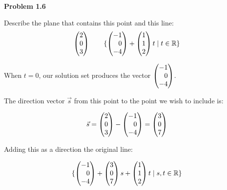 \documentclass[12pt]{article}
\newenvironment{problem}[1][default]{
  \begin{framed}\begin{minipage}{0.97\textwidth}
  \setlength{\parskip}{4mm}
  {\bf Problem #1}
}{\end{minipage}\end{framed}}
\newcommand\m[2][]{
	\ifthenelse{\equal {#1} {}}
		{\begin{pmatrix*}[r]#2\end{pmatrix*}}
		{\left(\begin{array}{#1}#2\end{array}\right)}
}
\begin{document}
\begin{problem}[1.6]
	Describe the plane that contains this point and this line:
	\begin{equation*}
		\m{2 \\ 0 \\ 3} \qquad \{ \m{-1 \\ 0 \\ -4} + \m{1 \\ 1 \\ 2}t \mid t \in \mathbb{R} \}
	\end{equation*}
\end{problem}

When $t = 0$, our solution set produces the vector $\m{-1 \\ 0 \\ -4}$.

The direction vector $\vec{s}$ from this point to the point we wish to include is:

\begin{equation}
	\vec{s} = \m{2 \\ 0 \\ 3} - \m{-1 \\ 0 \\ -4} = \m{3 \\ 0 \\ 7}
\end{equation}

Adding this as a direction the original line:

\begin{equation}
	\{ \m{-1 \\ 0 \\ -4} + \m{3 \\ 0 \\ 7} s + \m{1 \\ 1 \\ 2} t \mid s, t \in \mathbb{R} \}
\end{equation}
\end{document}
